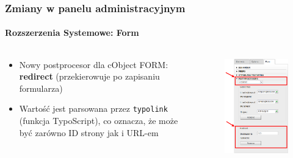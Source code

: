 \begin{frame}[fragile]
	\frametitle{Zmiany w panelu administracyjnym}
	\framesubtitle{Rozszerzenia Systemowe: Form}

	\begin{columns}[T]

		\begin{column}{.5\textwidth}
			\begin{itemize}
				\item Nowy postprocesor dla cObject FORM: \textbf{redirect}\newline
					(przekierowuje po zapisaniu formularza)
				\item Wartość jest parsowana przez \texttt{typolink} (funkcja TypoScript),\newline
					co oznacza, że może być zarówno ID strony jak i URL-em
			\end{itemize}
		\end{column}

		\begin{column}{.5\textwidth}
			\begin{figure}\vspace*{-0.4cm}
				\includegraphics[width=0.65\linewidth]{Images/BackendChanges/FormRedirectPostProcessor.png}
			\end{figure}
		\end{column}

	\end{columns}

\end{frame}


